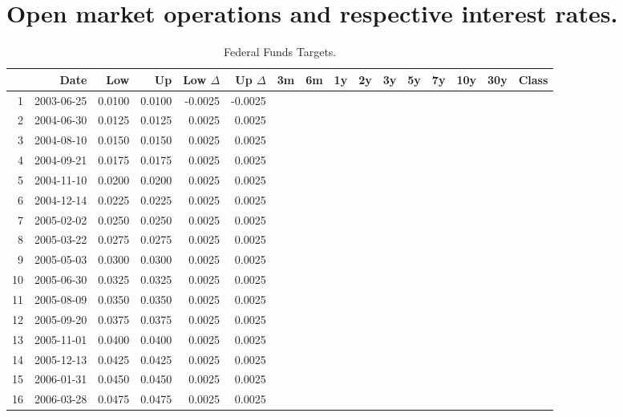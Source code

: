 \section{Open market operations and respective interest rates.}
\begin{sidewaystable}[htbp]
	\centering
	\small
	\caption{Federal Funds Targets.} 
	\label{tab:OMOs}
	\begin{tabular}{rrrrrrrrrrrrrrrr}
		\toprule
		& Date & Low & Up & Low $\Delta$ & Up $\Delta$ & 3m & 6m & 1y & 2y & 3y & 5y & 7y & 10y & 30y & Class \\ 
		\midrule
		1 & 2003-06-25 & 0.0100 & 0.0100 & -0.0025 & -0.0025 &  &  &  &  &  &  &  &  &  &  \\ 
		2 & 2004-06-30 & 0.0125 & 0.0125 & 0.0025 & 0.0025 &  &  &  &  &  &  &  &  &  &  \\ 
		3 & 2004-08-10 & 0.0150 & 0.0150 & 0.0025 & 0.0025 &  &  &  &  &  &  &  &  &  &  \\ 
		4 & 2004-09-21 & 0.0175 & 0.0175 & 0.0025 & 0.0025 &  &  &  &  &  &  &  &  &  &  \\ 
		5 & 2004-11-10 & 0.0200 & 0.0200 & 0.0025 & 0.0025 &  &  &  &  &  &  &  &  &  &  \\ 
		6 & 2004-12-14 & 0.0225 & 0.0225 & 0.0025 & 0.0025 &  &  &  &  &  &  &  &  &  &  \\ 
		7 & 2005-02-02 & 0.0250 & 0.0250 & 0.0025 & 0.0025 &  &  &  &  &  &  &  &  &  &  \\ 
		8 & 2005-03-22 & 0.0275 & 0.0275 & 0.0025 & 0.0025 &  &  &  &  &  &  &  &  &  &  \\ 
		9 & 2005-05-03 & 0.0300 & 0.0300 & 0.0025 & 0.0025 &  &  &  &  &  &  &  &  &  &  \\ 
		10 & 2005-06-30 & 0.0325 & 0.0325 & 0.0025 & 0.0025 &  &  &  &  &  &  &  &  &  &  \\ 
		11 & 2005-08-09 & 0.0350 & 0.0350 & 0.0025 & 0.0025 &  &  &  &  &  &  &  &  &  &  \\ 
		12 & 2005-09-20 & 0.0375 & 0.0375 & 0.0025 & 0.0025 &  &  &  &  &  &  &  &  &  &  \\ 
		13 & 2005-11-01 & 0.0400 & 0.0400 & 0.0025 & 0.0025 &  &  &  &  &  &  &  &  &  &  \\ 
		14 & 2005-12-13 & 0.0425 & 0.0425 & 0.0025 & 0.0025 &  &  &  &  &  &  &  &  &  &  \\ 
		15 & 2006-01-31 & 0.0450 & 0.0450 & 0.0025 & 0.0025 &  &  &  &  &  &  &  &  &  &  \\ 
		16 & 2006-03-28 & 0.0475 & 0.0475 & 0.0025 & 0.0025 &  &  &  &  &  &  &  &  &  &  \\ 

\end{tabular}
\end{sidewaystable}
